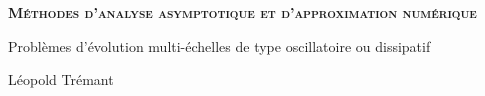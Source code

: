 \documentclass{these-dbl}
\begin{document}



\clearemptydoublepage

\begin{titlepage}
    \begin{center}
        \selectfont
       \Large\textbf{\textsc{
           M\'ethodes d'analyse asymptotique et d'approximation num\'erique
       }}

       \bigskip
       \large
       Problèmes d'évolution multi-\'echelles de type oscillatoire ou dissipatif

       \begin{minipage}{.5\textwidth}
        \bigskip\bigskip
        \hrulefill
        \bigskip\bigskip
       \end{minipage}

       \normalsize
       Léopold Trémant
    \end{center}
 \end{titlepage}

\clearemptydoublepage


\frontmatter
\clearemptydoublepage
\renewcommand{\contentsname}{Table of Contents}
\tableofcontents %

\clearemptydoublepage


\renewcommand{\theequation}{\thesection.\arabic{equation}}

\renewcommand*{\proofname}{Proof}

\clearemptydoublepage
\mainmatter

\end{document}
